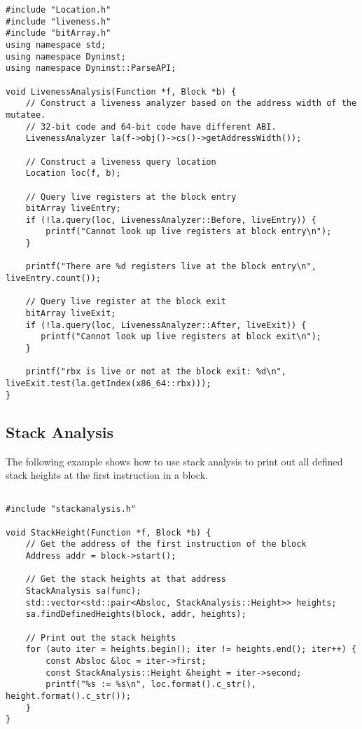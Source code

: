 \lstset{numbers=left, numberstyle=\tiny, stepnumber=5, numbersep=5pt}
\lstset{showstringspaces=false}
\begin{lstlisting}
#include "Location.h"
#include "liveness.h"
#include "bitArray.h"
using namespace std;
using namespace Dyninst;
using namespace Dyninst::ParseAPI;

void LivenessAnalysis(Function *f, Block *b) {   
    // Construct a liveness analyzer based on the address width of the mutatee.
    // 32-bit code and 64-bit code have different ABI.
    LivenessAnalyzer la(f->obj()->cs()->getAddressWidth());
   
    // Construct a liveness query location
    Location loc(f, b);
   
    // Query live registers at the block entry
    bitArray liveEntry;
    if (!la.query(loc, LivenessAnalyzer::Before, liveEntry)) {
        printf("Cannot look up live registers at block entry\n");
    }

    printf("There are %d registers live at the block entry\n", liveEntry.count());

    // Query live register at the block exit
    bitArray liveExit;
    if (!la.query(loc, LivenessAnalyzer::After, liveExit)) {
       printf("Cannot look up live registers at block exit\n");
    }

    printf("rbx is live or not at the block exit: %d\n", liveExit.test(la.getIndex(x86_64::rbx)));
}
\end{lstlisting}

\subsection{Stack Analysis}
The following example shows how to use stack analysis to print out all defined stack heights at the first instruction in a block.

\lstset{numbers=left, numberstyle=\tiny, stepnumber=5, numbersep=5pt}
\lstset{showstringspaces=false}
\begin{lstlisting}

#include "stackanalysis.h"

void StackHeight(Function *f, Block *b) {
    // Get the address of the first instruction of the block
    Address addr = block->start();

    // Get the stack heights at that address
    StackAnalysis sa(func);
    std::vector<std::pair<Absloc, StackAnalysis::Height>> heights;
    sa.findDefinedHeights(block, addr, heights);

    // Print out the stack heights
    for (auto iter = heights.begin(); iter != heights.end(); iter++) {
        const Absloc &loc = iter->first;
        const StackAnalysis::Height &height = iter->second;
        printf("%s := %s\n", loc.format().c_str(), height.format().c_str());
    }
}

\end{lstlisting}

